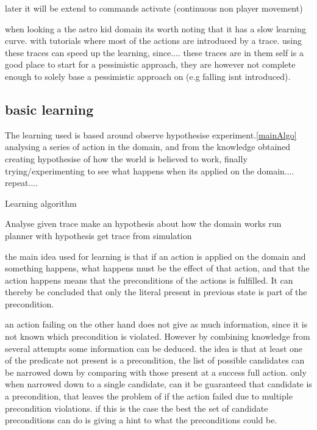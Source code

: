 	later it will be extend to commands activate  (continuous non player movement)
	
	
	
	when looking a the astro kid domain its worth noting that it has a slow learning curve. with tutorials where most of the actions are introduced by a trace.  using these traces can speed up the learning, since.... these traces are in them self is a good place to start for a pessimistic approach, they are however not complete enough to solely base a pessimistic approach on (e.g falling isnt introduced).




\subsection{basic learning}
	The learning used is based around observe hypothesise experiment.\ref{mainAlgo} analysing a series of action in the domain, and from the knowledge obtained creating hypothesise of how the world is believed to work, finally trying/experimenting to see what happens when its applied on the domain.... repeat.... 
	
	\begin{algorithm}
		\caption{Learning algorithm}
		\label{mainAlgo}
		\begin{algorithmic}[1]
			\State Analyse given trace
			\State make an hypothesis about how the domain works
			\State run planner with hypothesis
			\State get trace from simulation
			\EndWhile
			
		\end{algorithmic}
	\end{algorithm}	


		
	the main idea used for learning is that if an action is applied on the domain and something happens, what happens must be the effect of that action, and that the action happens means that the preconditions of the actions is fulfilled. It can thereby be concluded that only the literal present in previous state is part of the precondition.
	
	an action failing on the other hand does not give as much information, since it is not known which precondition is violated. However by combining knowledge from several attempts some information can be deduced. the idea is that at least one of the predicate not present is a precondition, the list of possible candidates can be narrowed down by comparing with those present at a success full action. only when narrowed down to a single candidate, can it be guaranteed that candidate is a precondition, that leaves the problem of if the action failed due to multiple precondition violations. if this is the case the best the set of candidate preconditions can do is giving a hint to what the preconditions could be.
	
